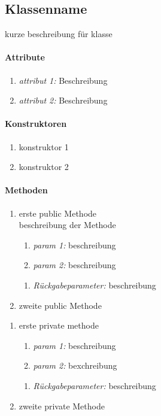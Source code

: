 \subsection{Klassenname}
kurze beschreibung für klasse

\paragraph{Attribute}
\begin{enumerate}[$\bullet$]
\item \textit{attribut 1:} Beschreibung
\item \textit{attribut 2:} Beschreibung
\end{enumerate}

\paragraph{Konstruktoren}
\begin{enumerate}[+]
\item konstruktor 1
\item konstruktor 2
\end{enumerate}

\paragraph{Methoden}

\begin{enumerate}[+]
\item erste public Methode\\
beschreibung der Methode

\begin{enumerate}[$\bullet$]
\item \textit{param 1:} beschreibung
\item \textit{param 2:} beschreibung
\end{enumerate}
\vspace{-0.2cm}
\begin{enumerate}[$\circ$]
\item \textit{Rückgabeparameter:} beschreibung
\end{enumerate}

\item zweite public Methode
\end{enumerate}

\begin{enumerate}[$-$]
\item erste private methode

\begin{enumerate}[$\bullet$]
\item \textit{param 1:} beschreibung
\item \textit{param 2:} bexchreibung
\end{enumerate}
\vspace{-0.2cm}
\begin{enumerate}[$\circ$]
\item \textit{Rückgabeparameter:} beschreibung
\end{enumerate}

\item zweite private Methode
\end{enumerate}